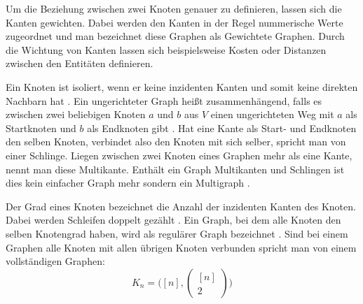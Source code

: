 Um die Beziehung zwischen zwei Knoten genauer zu definieren, lassen sich die Kanten gewichten.
Dabei werden den Kanten in der Regel nummerische Werte zugeordnet und man bezeichnet diese Graphen als Gewichtete Graphen.
Durch die Wichtung von Kanten lassen sich beispielsweise Kosten oder Distanzen zwischen den Entitäten definieren.

Ein Knoten ist isoliert, wenn er keine inzidenten Kanten und somit keine direkten Nachbarn hat \cite{knauer2015diskrete}.
Ein ungerichteter Graph heißt zusammenhängend, falls es zwischen zwei beliebigen Knoten $a$ und $b$ aus $V$ einen ungerichteten Weg mit $a$ als Startknoten und $b$ als Endknoten gibt \cite[36-38]{krumke2012graphentheoretische}.
Hat eine Kante als Start- und Endknoten den selben Knoten, verbindet also den Knoten mit sich selber, spricht man von einer Schlinge.
Liegen zwischen zwei Knoten eines Graphen mehr als eine Kante, nennt man diese Multikante.
Enthält ein Graph Multikanten und Schlingen ist dies kein einfacher Graph mehr sondern ein Multigraph \cite{felsner01}.

Der Grad eines Knoten bezeichnet die Anzahl der inzidenten Kanten des Knoten.
Dabei werden Schleifen doppelt gezählt \cite[Seite 13]{rahm2017}.
Ein Graph, bei dem alle Knoten den selben Knotengrad haben, wird als regulärer Graph bezeichnet \cite{felsner2012geometric}.
Sind bei einem Graphen alle Knoten mit allen übrigen Knoten verbunden spricht man von einem vollständigen Graphen:
\[K_{n}=\big([n],\begin{pmatrix}
					 [n] \\ 2
\end{pmatrix}\big)\]


